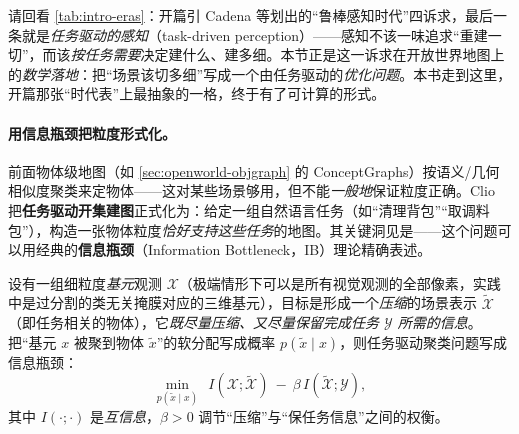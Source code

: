 \begin{insight}
请回看 \cref{tab:intro-eras}：开篇引 Cadena 等划出的“鲁棒感知时代”四诉求，最后一条就是\emph{任务驱动的感知}（task-driven perception）——感知不该一味追求“重建一切”，而该\emph{按任务需要}决定建什么、建多细。本节正是这一诉求在开放世界地图上的\emph{数学落地}：把“场景该切多细”写成一个由任务驱动的\emph{优化问题}。本书走到这里，开篇那张“时代表”上最抽象的一格，终于有了可计算的形式。
\end{insight}

\paragraph{用信息瓶颈把粒度形式化。}
前面物体级地图（如 \cref{sec:openworld-objgraph} 的 ConceptGraphs）按语义/几何相似度聚类来定物体——这对某些场景够用，但不能\emph{一般地}保证粒度正确。Clio\cite{maggio2024clio} 把\textbf{任务驱动开集建图}正式化为：给定一组自然语言任务（如“清理背包”“取调料包”），构造一张物体粒度\emph{恰好支持这些任务}的地图。其关键洞见是——这个问题可以用经典的\textbf{信息瓶颈}（Information Bottleneck，IB）理论\cite{tishby1999ib}精确表述。

设有一组细粒度\emph{基元}观测 $\mathcal{X}$（极端情形下可以是所有视觉观测的全部像素，实践中是过分割的类无关掩膜对应的三维基元），目标是形成一个\emph{压缩}的场景表示 $\tilde{\mathcal{X}}$（即任务相关的物体），它\emph{既尽量压缩、又尽量保留完成任务 $\mathcal{Y}$ 所需的信息}。把“基元 $x$ 被聚到物体 $\tilde{x}$”的软分配写成概率 $p(\tilde{x}\mid x)$，则任务驱动聚类问题写成信息瓶颈：
\begin{equation}
  \min_{p(\tilde{x}\mid x)}\ \ I(\mathcal{X};\tilde{\mathcal{X}})\ -\ \beta\,I(\tilde{\mathcal{X}};\mathcal{Y}),
  \label{eq:ow-ib}
\end{equation}
其中 $I(\cdot;\cdot)$ 是\emph{互信息}，$\beta>0$ 调节“压缩”与“保任务信息”之间的权衡\cite{maggio2024clio}。

